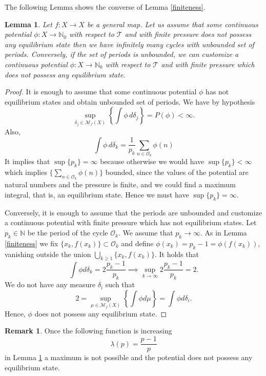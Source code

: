 \documentclass[12 pt]{amsart}
\newtheorem{lemma}[theorem]{Lemma}
\theoremstyle{definition}
\newtheorem{remark}[theorem]{Remark}
\begin{document}
	The following Lemma shows the converse of Lemma \ref{finiteness}.
	\begin{lemma}\label{converse}
		Let $f: X \to X$ be a general map. Let us assume that some continuous potential $\phi : X \to \mathbb{N}_{0}$ with respect to $\mathcal{T}$ and with finite pressure does not possess any equilibrium state then we have infinitely many cycles with unbounded set of periods. Conversely, if the set of periods is unbounded, we can customize a continuous potential $\phi : X \to \mathbb{N}_{0}$ with respect to $\mathcal{T}$ and with finite pressure which does not possess any equilibrium state.
	\end{lemma}
	\begin{proof} 		
		It is enough to assume that some continuous potential $\phi$  has not equilibrium states and obtain unbounded set of periods. We have by hypothesis
		\[
		\sup_{\delta_{j} \in \mathcal{M}_{f}(X)} \left\{ \int \phi \, d\delta_{j} \right\} = P(\phi) < \infty.
		\] 
		Also,
		\[
		\int \phi \, d\delta_{k} = \frac{1}{p_{k}} \sum_{n \in \mathcal{O}_{k}}\phi(n)
		\]
		It implies that $\sup\{p_{k}\} = \infty$ because otherwise we would have  $\sup\{p_{k}\} < \infty$ which implies $\{\sum_{n \in \mathcal{O}_{k}}\phi(n)\}$ bounded, since the values of the potential are natural numbers and the pressure is finite, and we could find a maximum integral, that is, an equilibrium state. Hence we must have $\sup\{p_{k}\} = \infty$.
		
		Conversely, it is enough to assume that the periods are unbounded and customize a continuous potential with finite pressure which has not equilibrium states. Let $p_{k} \in \mathbb{N}$ be the period of the cycle $\mathcal{O}_{k}$. We assume that $p_{k} \to \infty$. As in Lemma \ref{finiteness} we fix $\{x_{k}, f(x_{k})\} \subset \mathcal{O}_{k}$ and define $\phi(x_{k}) = p_{k} - 1 = \phi(f(x_{k}))$, vanishing outside the union $\bigcup_{k \geq 1}\{x_{k}, f(x_{k})\}$. It holds that
		\[
		\int \phi d\delta_{k} = 2\frac{p_{k} - 1}{p_{k}} \implies \sup_{k \to \infty} 2\frac{p_{k} - 1}{p_{k}} = 2.
		\]
		We do not have any measure $\delta_{i}$ such that
		\[
		2 = \sup_{\mu \in \mathcal{M}_{f}(X)} \left\{ \int \phi  d\mu \right\} = \int \phi d\delta_{i}.
		\]
		Hence, $\phi$ does not possess any equilibrium state.
	\end{proof}
	
	\begin{remark}
		 Once the following function is increasing
		\[
		\lambda(p) = \frac{p-1}{p}
		\]
		 in Lemma \ref{converse} a maximum is not possible and the potential does not possess any equilibrium state. 
	\end{remark}
	
\end{document}
